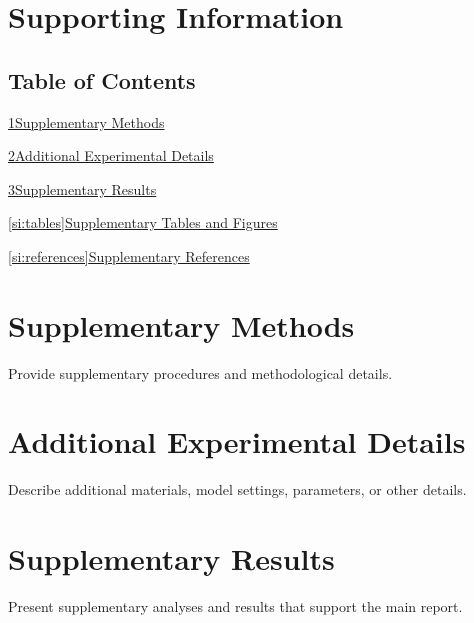 \newcommand{\SITitleOne}{Supplementary Methods}
\newcommand{\SITitleTwo}{Additional Experimental Details}
\newcommand{\SITitleThree}{Supplementary Results}
\newcommand{\SITitleFour}{Supplementary Tables and Figures}
\newcommand{\SITitleFive}{Supplementary References}
\newcommand{\SIEntry}[2]{%
  \noindent\hyperref[#2]{\ref*{#2}\enspace #1}\hfill\pageref{#2}\par\vspace{.6em}%
}

\section*{Supporting Information}
\subsection*{Table of Contents}
\SIEntry{\SITitleOne}{si:methods}
\SIEntry{\SITitleTwo}{si:details}
\SIEntry{\SITitleThree}{si:results}
\SIEntry{\SITitleFour}{si:tables}
\SIEntry{\SITitleFive}{si:references}

\clearpage
\setcounter{section}{0}
\renewcommand{\thesection}{S\arabic{section}}
\renewcommand{\theHsection}{SI.\arabic{section}}
\setcounter{figure}{0}
\setcounter{table}{0}
\renewcommand{\thefigure}{S\arabic{figure}}
\renewcommand{\thetable}{S\arabic{table}}
\renewcommand{\figurename}{Supplementary Fig.}
\renewcommand{\tablename}{Supplementary Table}
\renewcommand{\theHfigure}{SI.\arabic{figure}}
\renewcommand{\theHtable}{SI.\arabic{table}}
\section{\SITitleOne}\label{si:methods}
Provide supplementary procedures and methodological details.

\clearpage
\section{\SITitleTwo}\label{si:details}
Describe additional materials, model settings, parameters, or other details.

\clearpage
\section{\SITitleThree}\label{si:results}
Present supplementary analyses and results that support the main report.


